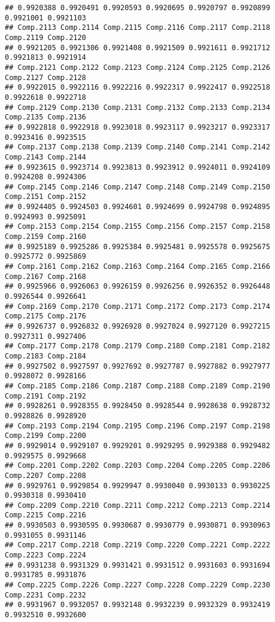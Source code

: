 \documentclass[
]{article}
\begin{document}
\begin{verbatim}
## 0.9920388 0.9920491 0.9920593 0.9920695 0.9920797 0.9920899 0.9921001 0.9921103 
## Comp.2113 Comp.2114 Comp.2115 Comp.2116 Comp.2117 Comp.2118 Comp.2119 Comp.2120 
## 0.9921205 0.9921306 0.9921408 0.9921509 0.9921611 0.9921712 0.9921813 0.9921914 
## Comp.2121 Comp.2122 Comp.2123 Comp.2124 Comp.2125 Comp.2126 Comp.2127 Comp.2128 
## 0.9922015 0.9922116 0.9922216 0.9922317 0.9922417 0.9922518 0.9922618 0.9922718 
## Comp.2129 Comp.2130 Comp.2131 Comp.2132 Comp.2133 Comp.2134 Comp.2135 Comp.2136 
## 0.9922818 0.9922918 0.9923018 0.9923117 0.9923217 0.9923317 0.9923416 0.9923515 
## Comp.2137 Comp.2138 Comp.2139 Comp.2140 Comp.2141 Comp.2142 Comp.2143 Comp.2144 
## 0.9923615 0.9923714 0.9923813 0.9923912 0.9924011 0.9924109 0.9924208 0.9924306 
## Comp.2145 Comp.2146 Comp.2147 Comp.2148 Comp.2149 Comp.2150 Comp.2151 Comp.2152 
## 0.9924405 0.9924503 0.9924601 0.9924699 0.9924798 0.9924895 0.9924993 0.9925091 
## Comp.2153 Comp.2154 Comp.2155 Comp.2156 Comp.2157 Comp.2158 Comp.2159 Comp.2160 
## 0.9925189 0.9925286 0.9925384 0.9925481 0.9925578 0.9925675 0.9925772 0.9925869 
## Comp.2161 Comp.2162 Comp.2163 Comp.2164 Comp.2165 Comp.2166 Comp.2167 Comp.2168 
## 0.9925966 0.9926063 0.9926159 0.9926256 0.9926352 0.9926448 0.9926544 0.9926641 
## Comp.2169 Comp.2170 Comp.2171 Comp.2172 Comp.2173 Comp.2174 Comp.2175 Comp.2176 
## 0.9926737 0.9926832 0.9926928 0.9927024 0.9927120 0.9927215 0.9927311 0.9927406 
## Comp.2177 Comp.2178 Comp.2179 Comp.2180 Comp.2181 Comp.2182 Comp.2183 Comp.2184 
## 0.9927502 0.9927597 0.9927692 0.9927787 0.9927882 0.9927977 0.9928072 0.9928166 
## Comp.2185 Comp.2186 Comp.2187 Comp.2188 Comp.2189 Comp.2190 Comp.2191 Comp.2192 
## 0.9928261 0.9928355 0.9928450 0.9928544 0.9928638 0.9928732 0.9928826 0.9928920 
## Comp.2193 Comp.2194 Comp.2195 Comp.2196 Comp.2197 Comp.2198 Comp.2199 Comp.2200 
## 0.9929014 0.9929107 0.9929201 0.9929295 0.9929388 0.9929482 0.9929575 0.9929668 
## Comp.2201 Comp.2202 Comp.2203 Comp.2204 Comp.2205 Comp.2206 Comp.2207 Comp.2208 
## 0.9929761 0.9929854 0.9929947 0.9930040 0.9930133 0.9930225 0.9930318 0.9930410 
## Comp.2209 Comp.2210 Comp.2211 Comp.2212 Comp.2213 Comp.2214 Comp.2215 Comp.2216 
## 0.9930503 0.9930595 0.9930687 0.9930779 0.9930871 0.9930963 0.9931055 0.9931146 
## Comp.2217 Comp.2218 Comp.2219 Comp.2220 Comp.2221 Comp.2222 Comp.2223 Comp.2224 
## 0.9931238 0.9931329 0.9931421 0.9931512 0.9931603 0.9931694 0.9931785 0.9931876 
## Comp.2225 Comp.2226 Comp.2227 Comp.2228 Comp.2229 Comp.2230 Comp.2231 Comp.2232 
## 0.9931967 0.9932057 0.9932148 0.9932239 0.9932329 0.9932419 0.9932510 0.9932600 

\end{verbatim}
\end{document}
